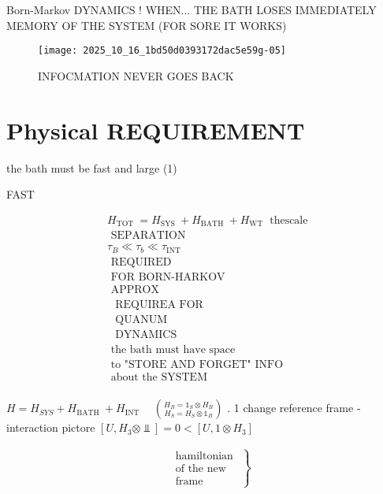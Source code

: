 Born-Markov DYNAMICS
! WHEN... THE BATH LOSES IMMEDIATELY MEMORY OF THE SYSTEM (FOR SORE IT WORKS)

\begin{figure}[h]
\begin{center}
  \texttt{[image: 2025\_10\_16\_1bd50d0393172dac5e59g-05]}
\captionsetup{labelformat=empty}
\caption{INFOCMATION NEVER GOES BACK}
\end{center}
\end{figure}

\section*{Physical REQUIREMENT}
the bath must be fast and large
(1)

FAST

$$
\begin{aligned}
& H_{\text {TOT }}=H_{\text {SYS }}+H_{\text {BATH }}+H_{\text {WT }} \text { thescale } \\
& \text { SEPARATION } \\
& \tau_{B} \ll \tau_{b} \ll \tau_{\text {INT }} \\
& \text { REQUIRED } \\
& \text { FOR BORN-HARKOV } \\
& \text { APPROX } \\
& \begin{array}{l}\text { REQUIREA FOR } \\ \text { QUANUM } \\\text { DYNAMICS }\end{array} \\
& \text { the bath must have space } \\
& \text { to "STORE AND FORGET" INFO } \\
& \text { about the SYSTEM } \\
\end{aligned}
$$

$H=H_{S Y S}+H_{\text {BATH }}+H_{\text {INT }} \quad\binom{H_{B}=\mathbb{1}_{S} \otimes H_{B}}{H_{S}=H_{S} \otimes \mathbb{1}_{B}}$
\Step. 1 change reference frame - interaction pictore
$\left[U, H_{3} \otimes \Perp\right]=0<\left[U, 1 \otimes H_{3}\right]$

$$
\begin{aligned}
&\left.\begin{array}{l}\text { hamiltonian } \\ \text { of the new } \\ \text { frame }\end{array}\right\}
\end{aligned}
$$

